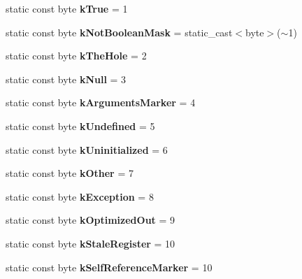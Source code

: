 \begin{DoxyCompactItemize}
static const byte {\bfseries k\+True} = 1
\item 
\mbox{\label{classv8_1_1internal_1_1Oddball_a0286390eeab3d5ff7cd0e0dd09712c1b}} 
static const byte {\bfseries k\+Not\+Boolean\+Mask} = static\+\_\+cast$<$byte$>$($\sim$1)
\item 
\mbox{\label{classv8_1_1internal_1_1Oddball_a56d93ed85d040bf41eb738a1f0e0c2f2}} 
static const byte {\bfseries k\+The\+Hole} = 2
\item 
\mbox{\label{classv8_1_1internal_1_1Oddball_a7e9e260f9a1ee980b4ac12e2d534ff27}} 
static const byte {\bfseries k\+Null} = 3
\item 
\mbox{\label{classv8_1_1internal_1_1Oddball_a033dce401ba10d3d68a4fc848464bd53}} 
static const byte {\bfseries k\+Arguments\+Marker} = 4
\item 
\mbox{\label{classv8_1_1internal_1_1Oddball_a38ddddfd10d8732bcef0714b3bd57008}} 
static const byte {\bfseries k\+Undefined} = 5
\item 
\mbox{\label{classv8_1_1internal_1_1Oddball_ab030131494be698f1e666ce7d50cc873}} 
static const byte {\bfseries k\+Uninitialized} = 6
\item 
\mbox{\label{classv8_1_1internal_1_1Oddball_af181f2f5cc1b00216ed1a2ebacecc40e}} 
static const byte {\bfseries k\+Other} = 7
\item 
\mbox{\label{classv8_1_1internal_1_1Oddball_a56b06e715a40821036ac6fec67b7ec60}} 
static const byte {\bfseries k\+Exception} = 8
\item 
\mbox{\label{classv8_1_1internal_1_1Oddball_a2fd3c39d2e5319a9e0adef6c8af29dde}} 
static const byte {\bfseries k\+Optimized\+Out} = 9
\item 
\mbox{\label{classv8_1_1internal_1_1Oddball_a23c51a879da822543f18a64b81367059}} 
static const byte {\bfseries k\+Stale\+Register} = 10
\item 
\mbox{\label{classv8_1_1internal_1_1Oddball_a71734783dd0e9742c02189ed5e7dc8a2}} 
static const byte {\bfseries k\+Self\+Reference\+Marker} = 10
\end{DoxyCompactItemize}


